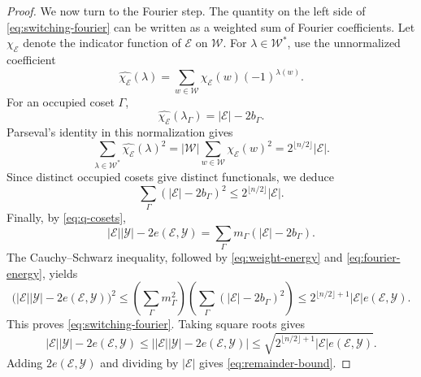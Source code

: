 \documentclass[10pt,a4paper]{amsart}
\begin{document}
\begin{proof}
We now turn to the Fourier step.  The quantity on the left side of
\eqref{eq:switching-fourier} can be written as a weighted sum of Fourier
coefficients.  Let \(\chi_{\mathcal E}\) denote the indicator function of
\(\mathcal E\) on \(\mathcal W\).  For \(\lambda\in\mathcal W^*\), use the
unnormalized coefficient
\[
 \widehat{\chi_{\mathcal E}}(\lambda)
 =
 \sum_{w\in\mathcal W}
 \chi_{\mathcal E}(w)(-1)^{\lambda(w)}.
\]
For an occupied coset \(\Gamma\),
\[
 \widehat{\chi_{\mathcal E}}(\lambda_\Gamma)
 =
 |\mathcal E|-2b_\Gamma.
\]
Parseval's identity in this normalization gives
\[
 \sum_{\lambda\in\mathcal W^*}
 \widehat{\chi_{\mathcal E}}(\lambda)^2
 =
 |\mathcal W|
 \sum_{w\in\mathcal W}\chi_{\mathcal E}(w)^2
 =
 2^{\lfloor n/2\rfloor}|\mathcal E|.
\]
Since distinct occupied cosets give distinct functionals, we deduce
\begin{equation}
 \sum_\Gamma (|\mathcal E|-2b_\Gamma)^2
 \le
 2^{\lfloor n/2\rfloor}|\mathcal E|.
\label{eq:fourier-energy}
\end{equation}
Finally, by \eqref{eq:q-cosets},
\[
 |\mathcal E||\mathcal Y|-2e(\mathcal E,\mathcal Y)
 =
 \sum_\Gamma m_\Gamma(|\mathcal E|-2b_\Gamma).
\]
The Cauchy--Schwarz inequality, followed by \eqref{eq:weight-energy} and
\eqref{eq:fourier-energy}, yields
\[
 \bigl(|\mathcal E||\mathcal Y|-2e(\mathcal E,\mathcal Y)\bigr)^2
 \le
 \left(\sum_\Gamma m_\Gamma^2\right)
 \left(\sum_\Gamma(|\mathcal E|-2b_\Gamma)^2\right)
 \le
 2^{\lfloor n/2\rfloor+1}|\mathcal E|e(\mathcal E,\mathcal Y).
\]
This proves \eqref{eq:switching-fourier}.  Taking square roots gives
\[
 |\mathcal E||\mathcal Y|-2e(\mathcal E,\mathcal Y)
 \le
 \bigl||\mathcal E||\mathcal Y|-2e(\mathcal E,\mathcal Y)\bigr|
 \le
 \sqrt{2^{\lfloor n/2\rfloor+1}|\mathcal E|e(\mathcal E,\mathcal Y)}.
\]
Adding \(2e(\mathcal E,\mathcal Y)\) and dividing by \(|\mathcal E|\) gives
\eqref{eq:remainder-bound}.
\end{proof}
\end{document}
